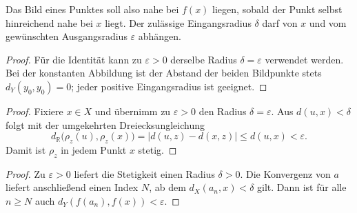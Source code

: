 \documentclass[main.tex]{subfiles}
\begin{document}
Das Bild eines Punktes soll also nahe bei \(f(x)\) liegen, sobald der Punkt
selbst hinreichend nahe bei \(x\) liegt. Der zulässige Eingangsradius
\(\delta\) darf von \(x\) und vom gewünschten Ausgangsradius
\(\varepsilon\) abhängen.

\begin{proof}
Für die Identität kann zu \(\varepsilon>0\) derselbe Radius
\(\delta=\varepsilon\) verwendet werden. Bei der konstanten Abbildung ist
der Abstand der beiden Bildpunkte stets \(d_Y(y_0,y_0)=0\); jeder positive
Eingangsradius ist geeignet.
\end{proof}

\begin{proof}
Fixiere \(x\in X\) und übernimm zu \(\varepsilon>0\) den Radius
\(\delta=\varepsilon\). Aus \(d(u,x)<\delta\) folgt mit der umgekehrten
Dreiecksungleichung
\[
 d_{\mathbb R}\bigl(\rho_z(u),\rho_z(x)\bigr)
 =|d(u,z)-d(x,z)|
 \leq d(u,x)<\varepsilon.
\]
Damit ist \(\rho_z\) in jedem Punkt \(x\) stetig.
\end{proof}

\begin{proof}
Zu \(\varepsilon>0\) liefert die Stetigkeit einen Radius \(\delta>0\).
Die Konvergenz von \(a\) liefert anschließend einen Index \(N\), ab dem
\(d_X(a_n,x)<\delta\) gilt. Dann ist für alle \(n\geq N\) auch
\(d_Y(f(a_n),f(x))<\varepsilon\).
\end{proof}
\end{document}

